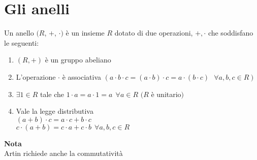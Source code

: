 \documentclass[12px]{article}
\begin{document}
{	\section{Gli anelli}
	\begin{defi}
		Un anello $(R$, $+$, $\cdot)$ è un insieme $R$ dotato di due operazioni, $+,\cdot$ che soddisfano le seguenti:
		\begin{enumerate}
			\item $(R, + )$ è un gruppo abeliano
			\item L'operazione $\cdot$ è associativa $(a\cdot b\cdot c = (a\cdot b)\cdot c = a\cdot (b\cdot c) \ \ \ \forall a,b,c\in R) $ 
			\item $\exists 1\in R $ tale che $1\cdot a  = a \cdot 1  = a \ \ \forall a\in R$ $(R$ è unitario$)$
			\item Vale la legge distributiva \\$ (a + b)\cdot c= a\cdot c + b\cdot c$ \\
				$c\cdot (a + b) = c\cdot a + c\cdot b \ \ \forall a,b,c\in R$
		\end{enumerate}
\textbf{Nota}\\
Artin richiede  anche la commutatività


\end{defi}}
\end{document}
